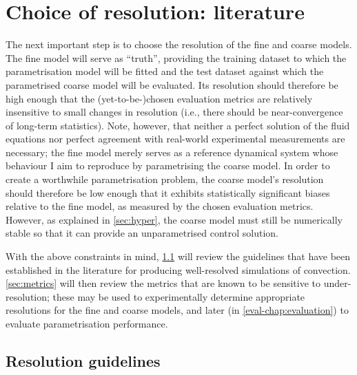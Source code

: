 \documentclass[../main.tex]{subfiles}
\begin{document}
\section{Choice of resolution: literature} \label{sec:resolution}
The next important step is to choose the resolution of the fine and coarse
models. The fine model will serve as ``truth'', providing the training dataset
to which the parametrisation model will be fitted and the test dataset against
which the parametrised coarse model will be evaluated. Its resolution should
therefore be high enough that the (yet-to-be-)chosen evaluation metrics are
relatively insensitive to small changes in resolution (i.e., there should be
near-convergence of long-term statistics). Note, however, that neither a
perfect solution of the fluid equations nor perfect agreement with real-world
experimental measurements are necessary; the fine model merely serves as a
reference dynamical system whose behaviour I aim to reproduce by parametrising
the coarse model. In order to create a worthwhile parametrisation problem, the
coarse model's resolution should therefore be low enough that it exhibits
statistically significant biases relative to the fine model, as measured by the
chosen evaluation metrics. However, as explained in \cref{sec:hyper}, the
coarse model must still be numerically stable so that it can provide an
unparametrised control solution.

With the above constraints in mind, \cref{sec:res_requirements} will review the
guidelines that have been established in the literature for producing
well-resolved simulations of \rb{} convection. \cref{sec:metrics} will
then review the metrics that are known to be sensitive to under-resolution;
these may be used to experimentally determine appropriate resolutions for the
fine and coarse models, and later (in \cref{eval-chap:evaluation}) to evaluate
parametrisation performance.


\subsection{Resolution guidelines}
\label{sec:res_requirements}
\end{document}
